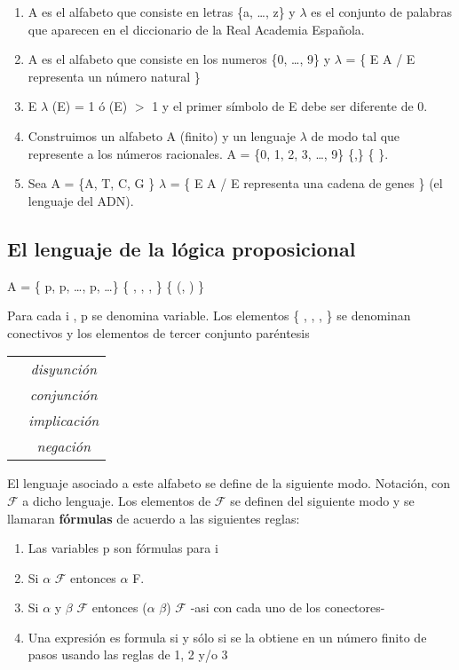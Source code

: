 \begin{example}
\begin{enumerate}
  \item A es el alfabeto que consiste en letras \{a, \ldots, z\} y \(\lambda\) es el conjunto de palabras que aparecen en el diccionario de la Real Academia Espa\~nola.
  \item A es el alfabeto que consiste en los numeros \{0, \ldots, 9\} y \(\lambda\) =   \{ E \cin A\supi{*} / E representa un n\'umero natural \}
  \item E \csubseteq \(\lambda\) \ciff \length(E) = 1 \'o \length(E) $>$ 1 y el primer s\'imbolo de E debe ser diferente de 0.
  \item Construimos un alfabeto A (finito) y un lenguaje \(\lambda\) de modo tal que represente a los n\'umeros racionales. A = \{0, 1, 2, 3, \ldots ,  9\} \ccup \{,\} \ccup \{ \cland \}.
  \item Sea A = \{A, T, C, G \} \(\lambda\) = \{ E \cin A\supi{*} / E representa una cadena de genes \} (el lenguaje del ADN).
\end{enumerate} 
\end{example}

\subsection{El lenguaje de la l\'ogica proposicional}

A = \{ p, p, \ldots , p, \ldots \} \ccup \{ \cland, \clor, \then, \cneg \} \ccup \{ (, ) \}

Para cada i \cin \cN, p se denomina variable. Los elementos
\{ \cland, \clor, \then, \cneg \} se denominan conectivos y los elementos de tercer conjunto par\'entesis
\begin{center}
\begin{tabular}{ l | c }
  \hline			
	\clor	& \textit{disyunci\'on}		\\
	\cland	& \textit{conjunci\'on}		\\
	\then	& \textit{implicaci\'on}	\\
	\cneg	& \textit{negaci\'on}		\\
  \hline  
\end{tabular}
\end{center} 
El lenguaje asociado a este alfabeto se define de la siguiente modo. Notaci\'on, con $\mathcal{F}$ a dicho lenguaje. Los elementos de $\mathcal{F}$ se definen  del siguiente modo y se llamaran \textbf{f\'ormulas} de acuerdo a las siguientes reglas:

\begin{enumerate}
  \item Las variables p son f\'ormulas para \cforall i \cin \cN
  \item Si \(\alpha\) \cin $\mathcal{F}$ entonces \cneg \(\alpha\) \cin F. 
  \item Si \(\alpha\) y \(\beta\) \cin $\mathcal{F}$ entonces (\(\alpha\) \clor
  \(\beta\)) \cin $\mathcal{F}$ -asi con cada uno de los conectores-
  \item Una expresi\'on es formula si y s\'olo si se la obtiene en un n\'umero finito
  de pasos usando las reglas de 1, 2 y/o 3
\end{enumerate} 